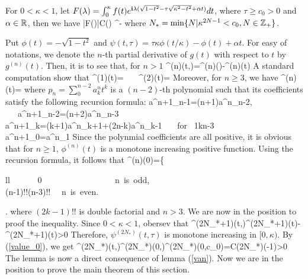 \documentclass[11pt]{iopart}
\begin{document}
\begin{lem}\label{cross_term}
	For $0<\kappa<1$, let $F(\lambda)=\int_{0}^{\kappa}f(t)e^{\mathbf{i}\lambda(\sqrt{1-t^2}-\tau\sqrt{\kappa^2-t^2}+\alpha t)}dt$, where $\tau\geq c_0>0$ and $\alpha\in\mathbb{R}$, then we have
	\ben
	|F(\lambda)|\leq C(\kappa) \lambda^{-} 
	\een
	where $N_*=\min\{N|\kappa^{2N-1}<c_0,N\in {\mathbb{Z}}_+ \}$.
\end{lem}
\debproof
Put $\phi(t)=-\sqrt{1-t^2}$ and $\psi(t,\tau)=\tau\kappa\phi(t/\kappa)-\phi(t)+\alpha t$. For easy of notations, we denote the $n$-th partial derivative of $g(t)$ with respect to $t$ by $g^{(n)}(t)$. Then, it is to see that, for $n>1$
\ben
\psi^{(n)}(t,\tau)=\phi^{(n)}()-\phi^{(n)}(t)
\een
A standard computation show that
\ben
\phi^{(1)}(t)=  \ \ \
\phi^{(2)}(t)=
\een
Moreover, for $n\geq3$, we have
\be
\phi^{(n)}(t)=
\ee
where $p_n=\sum_{0}^{n-2}a^n_{k}t^k$ is a $(n-2)$-th polynomial such that its  coefficients satisfy the following recursion formula:
\ben
a^{n+1}_{n-1}=(n+1)a^n_{n-2}, \ \ \ a^{n+1}_{n-2}=(n+2)a^n_{n-3} \\
a^{n+1}_{k}=(k+1)a^n_{k+1}+(2n-k)a^n_{k-1} \ \ \ \mbox{for} \ 1\leq k\leq n-3 \\
a^{n+1}_{0}=a^n_{1}
\een
Since the polynmial coefficients are all positive, it is obvious that for $n\geq 1$, $\phi^{(n)}(t)$ is a monotone increasing positive function. Using the recursion formula, it follows that
\be \label{value_0}
\phi^{(n)}(0)=\left\{ \begin{array}{ll}
	\ \ \ \ \ \ 	0  \ \ \ \ \ \ \ \ \ \ \  \ \ \ \ \ \  \mbox{n is odd},\\
	(n-1)!!(n-3)!! \ \ \mbox{n is even}.
\end{array} \right.
\ee
where $(2k-1)!!$ is double factorial and $n>3$. We are now in the position to proof the inequality. Since $0<\kappa<1$, obersev that 
\ben
\psi^{(2N_*+1)}(t,\tau)\geq {}\phi^{(2N_*+1)}(t)-\phi^{(2N_*+1)}(t)>0
\een
Therefore, $\psi^{(2N_*)}(t,\tau)$ is monotone increasing in $[0,\kappa)$. By (\ref{value_0}), we get
\be\hspace{-1.5cm}
\psi^{(2N_*)}(t,\tau)\geq\psi^{(2N_*)}(0,\tau)\geq\psi^{(2N_*)}(0,c_0)=C(2N_*)(-1)>0
\ee
The lemma is now a direct consequence of lemma (\ref{van}).
\finproof
Now we are in the position to prove the main theorem of this section.
\end{document}
